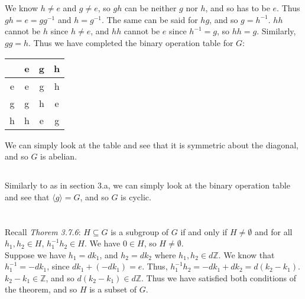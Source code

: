 \documentclass{article}
\begin{document}
\section{} %
\subsection{} %
We know $h\neq e$ and $g\neq e$, so $gh$ can be neither $g$ nor $h$, and so has
to be $e$. Thus $gh=e=gg^{-1}$ and $h=g^{-1}$. The same can be said for $hg$,
and so $g=h^{-1}$. $hh$ cannot be $h$ since $h\neq e$, and $hh$ cannot be $e$
since $h^{-1}=g$, so $hh=g$. Similarly, $gg=h$. Thus we have completed the
binary operation table for $G$:
\newline
\newline
\begin{tabular}{c|ccc}
	& e & g & h \\
	\hline
	e & e & g & h \\
	g & g & h & e \\
	h & h & e & g \\
\end{tabular}
\newline
\newline
We can simply look at the table and see that it is symmetric about the diagonal,
and so $G$ is abelian.
\subsection{} %
Similarly to as in section 3.a, we can simply look at the binary operation
table and see that $\langle g\rangle=G$, and so $G$ is cyclic.
\section{} %
\subsection{} %
Recall \emph{Thorem 3.7.6}: $H\subseteq G$ is a subgroup of $G$ if and only if
$H\neq\emptyset$ and for all $h_1,h_2\in H$, $h_1^{-1}h_2\in H$.
\newline
\newline
We have $0\in H$, so $H\neq\emptyset$.\\
Suppose we have  $h_1=dk_1$, and $h_2=dk_2$ where $h_1,h_2\in d\mathbb{Z}$. We
know that $h_1^{-1}=-dk_1$, since $dk_1+(-dk_1)=e$. Thus,
$h_1^{-1}h_2=-dk_1+dk_2=d(k_2-k_1)$. $k_2-k_1\in\mathbb{Z}$, and so
$d(k_2-k_1)\in d\mathbb{Z}$. Thus we have satisfied both conditions of the
theorem, and so $H$ is a subset of $G$.
\end{document}
